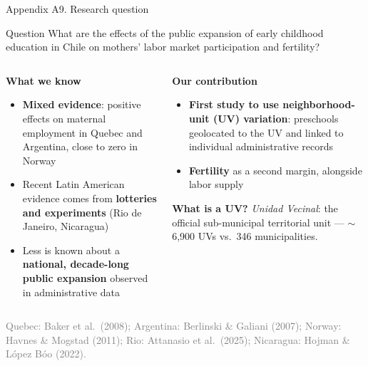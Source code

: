 \documentclass[aspectratio=169,10pt]{beamer}
\newcommand{\takeaway}[1]{\par\vspace{6pt}{\small\textcolor{steel}{$\Rightarrow$}\ \textbf{\textcolor{navy}{#1}}}}
\begin{document}
\begin{frame}{Appendix A9. Research question}
\begin{block}{Question}
\small What are the effects of the public expansion of early childhood education in Chile on mothers' labor market participation and fertility?
\end{block}

\vspace{4pt}
\begin{columns}[T]
\begin{column}{0.49\textwidth}
{\small\textcolor{steel}{\textbf{What we know}}}
\begin{itemize}
  \footnotesize
  \item \textbf{Mixed evidence}: positive effects on maternal employment in Quebec and Argentina, close to zero in Norway
  \item Recent Latin American evidence comes from \textbf{lotteries and experiments} (Rio de Janeiro, Nicaragua)
  \item Less is known about a \textbf{national, decade-long public expansion} observed in administrative data
\end{itemize}
\end{column}
\begin{column}{0.49\textwidth}
{\small\textcolor{steel}{\textbf{Our contribution}}}
\begin{itemize}
  \footnotesize
  \item \textbf{First study to use neighborhood-unit (UV) variation}: preschools geolocated to the UV and linked to individual administrative records
  \item \textbf{Fertility} as a second margin, alongside labor supply
\end{itemize}

\vspace{4pt}
\colorbox{bgpanel}{\parbox{0.95\linewidth}{\raggedright\footnotesize \textbf{\textcolor{steel}{What is a UV?}} \emph{Unidad Vecinal}: the official sub-municipal territorial unit --- $\sim$6{,}900 UVs vs.\ 346 municipalities.}}
\end{column}
\end{columns}

\takeaway{Finer geography: a sharper measure of exposure and more variation to identify the effect.}
\par\vspace{10pt}
{\tiny\textcolor{graytext}{Quebec: Baker et al.\ (2008); Argentina: Berlinski \& Galiani (2007); Norway: Havnes \& Mogstad (2011); Rio: Attanasio et al.\ (2025); Nicaragua: Hojman \& L\'opez B\'oo (2022).}\par}
\end{frame}
\end{document}
